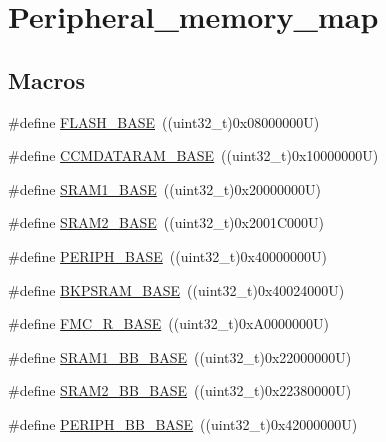 \hypertarget{group___peripheral__memory__map}{}\section{Peripheral\+\_\+memory\+\_\+map}
\label{group___peripheral__memory__map}
\subsection*{Macros}
\begin{DoxyCompactItemize}
\item 
\#define \hyperlink{group___peripheral__memory__map_ga23a9099a5f8fc9c6e253c0eecb2be8db}{F\+L\+A\+S\+H\+\_\+\+B\+A\+SE}~((uint32\+\_\+t)0x08000000\+U)
\item 
\#define \hyperlink{group___peripheral__memory__map_gabea1f1810ebeac402164b42ab54bcdf9}{C\+C\+M\+D\+A\+T\+A\+R\+A\+M\+\_\+\+B\+A\+SE}~((uint32\+\_\+t)0x10000000\+U)
\item 
\#define \hyperlink{group___peripheral__memory__map_ga7d0fbfb8894012dbbb96754b95e562cd}{S\+R\+A\+M1\+\_\+\+B\+A\+SE}~((uint32\+\_\+t)0x20000000\+U)
\item 
\#define \hyperlink{group___peripheral__memory__map_gadbb42a3d0a8a90a79d2146e4014241b1}{S\+R\+A\+M2\+\_\+\+B\+A\+SE}~((uint32\+\_\+t)0x2001\+C000\+U)
\item 
\#define \hyperlink{group___peripheral__memory__map_ga9171f49478fa86d932f89e78e73b88b0}{P\+E\+R\+I\+P\+H\+\_\+\+B\+A\+SE}~((uint32\+\_\+t)0x40000000\+U)
\item 
\#define \hyperlink{group___peripheral__memory__map_ga52e57051bdf8909222b36e5408a48f32}{B\+K\+P\+S\+R\+A\+M\+\_\+\+B\+A\+SE}~((uint32\+\_\+t)0x40024000\+U)
\item 
\#define \hyperlink{group___peripheral__memory__map_ga7a599164cd92798542bc6288793d1ed5}{F\+M\+C\+\_\+\+R\+\_\+\+B\+A\+SE}~((uint32\+\_\+t)0x\+A0000000\+U)
\item 
\#define \hyperlink{group___peripheral__memory__map_gac4c4f61082e4b168f29d9cf97dc3ca5c}{S\+R\+A\+M1\+\_\+\+B\+B\+\_\+\+B\+A\+SE}~((uint32\+\_\+t)0x22000000\+U)
\item 
\#define \hyperlink{group___peripheral__memory__map_gac33cb6edadf184ab9860d77089503922}{S\+R\+A\+M2\+\_\+\+B\+B\+\_\+\+B\+A\+SE}~((uint32\+\_\+t)0x22380000\+U)
\item 
\#define \hyperlink{group___peripheral__memory__map_gaed7efc100877000845c236ccdc9e144a}{P\+E\+R\+I\+P\+H\+\_\+\+B\+B\+\_\+\+B\+A\+SE}~((uint32\+\_\+t)0x42000000\+U)

\end{DoxyCompactItemize}
